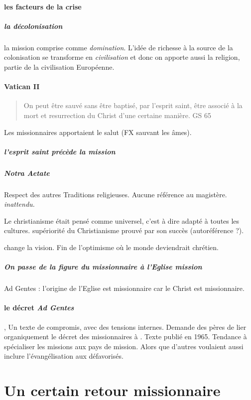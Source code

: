 \paragraph{les facteurs de la crise} 
\subparagraph{la décolonisation} la mission comprise comme \textit{domination}. L'idée de richesse à la source de la colonisation se transforme en \textit{civilisation} et donc on apporte aussi la religion, partie de la civilisation Européenne.

\paragraph{Vatican II}
\begin{quote}
On peut être sauvé sans être baptisé, par l'esprit saint, être associé à la mort et resurrection du Christ d'une certaine manière.
GS 65
\end{quote}

Les missionnaires apportaient le salut (FX sauvant les âmes). 

\subparagraph{l'esprit saint précède la mission}

\subparagraph{Notra Aetate} Respect des autres Traditions religieuses. Aucune référence au magistère. \textit{inattendu.}

\begin{Synthesis}
Le christianisme était pensé comme universel, c'est à dire adapté à toutes les cultures.
supériorité du Christianisme prouvé par son succès (autoréférence ?).
\end{Synthesis}
\NA change la vision. Fin de l'optimisme où le monde deviendrait chrétien. 

\subparagraph{On passe de la figure du missionnaire à l'Eglise mission} Ad Gentes  : l'origine de l'Eglise est missionnaire car le Christ est missionnaire. 

\paragraph{le décret \textit{Ad Gentes}} \href{https://www.vatican.va/archive/hist_councils/ii_vatican_council/documents/vat-ii\_decree\_19651207\_ad-gentes\_fr.html}{\AG}, Un texte de compromis, avec des tensions internes. Demande des pères de lier organiquement le décret des missionnaires à \LG. Texte publié en 1965. Tendance à spécialiser les missions aux pays de mission. Alors que d'autres voulaient aussi inclure l'évangélisation aux défavorisés.



\section{Un certain retour missionnaire}

